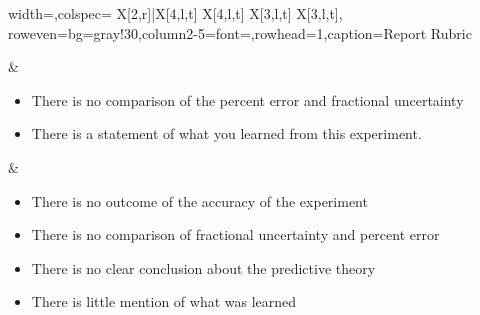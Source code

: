 \documentclass[twoside,11pt,ShortChapTitles]{BYUTextbook}
\begin{document}
\begin{longtblr}{width=\textwidth,colspec={ X[2,r]|X[4,l,t] X[4,l,t] X[3,l,t] X[3,l,t]}, row{even}={bg=gray!30},column{2-5}={font=\footnotesize},rowhead=1,caption={Report Rubric}}
\begin{varwidth}[t]{\linewidth}
\begin{itemize}[leftmargin=*]
\end{itemize}
\end{varwidth}
&
\begin{varwidth}[t]{\linewidth}
\begin{itemize}[leftmargin=*]
\item There is no comparison of the percent error and fractional uncertainty
\item There is a statement of what you learned from this experiment. 



\end{itemize}
\end{varwidth}
&
\begin{varwidth}[t]{\linewidth}
\begin{itemize}[leftmargin=*]
\item There is no outcome  of the accuracy of the experiment
\item There is no comparison of fractional uncertainty and percent error
\item There is no clear conclusion about the predictive theory
\item There is little mention of what was learned

\end{itemize}
\end{varwidth}


\end{longtblr}

\restoregeometry
\end{document}
